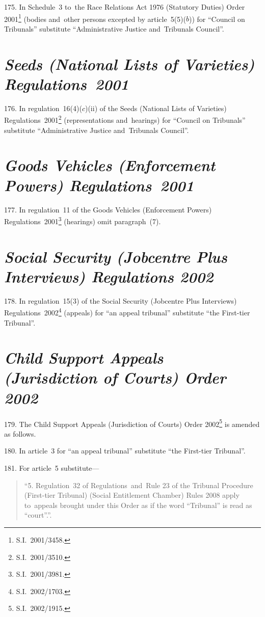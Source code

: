 \documentclass[12pt,a4paper]{article}
\begin{document}
175.  In Schedule~3 to~the Race Relations Act 1976 (Statutory Duties) Order 2001\footnote{S.I.~2001/3458.} (bodies and~other persons excepted by article~5(5)($b$)) for “Council on Tribunals” substitute “Administrative Justice and~Tribunals Council”.

\section*{\itshape Seeds (National Lists of Varieties) Regulations~2001}

176.  In regulation~16(4)($c$)(ii)  of the Seeds (National Lists of Varieties) Regulations~2001\footnote{S.I.~2001/3510.} (representations and~hearings) for “Council on Tribunals” substitute “Administrative Justice and~Tribunals Council”.

\section*{\itshape Goods Vehicles (Enforcement Powers) Regulations~2001}

177.  In regulation~11 of the Goods Vehicles (Enforcement Powers) Regulations~2001\footnote{S.I.~2001/3981.} (hearings) omit paragraph~(7).

\section*{\itshape\sloppy Social Security (Jobcentre Plus Interviews) Regulations 2002}

178.  In regulation~15(3) of the Social Security (Jobcentre Plus Interviews) Regulations~2002\footnote{S.I.~2002/1703.} (appeals) for “an appeal tribunal” substitute “the First-tier Tribunal”.

\section*{\itshape\sloppy{} Child Support Appeals (Jurisdiction of Courts) Order 2002}

179.  The Child Support Appeals (Jurisdiction of Courts) Order 2002\footnote{S.I.~2002/1915.} is amended as follows.

\medskip

180.  In article~3 for “an appeal tribunal” substitute “the First-tier Tribunal”.

\medskip

181.  For article~5 substitute—
\begin{quotation}
“5.  Regulation~32 of Regulations~and~Rule 23 of the Tribunal Procedure (First-tier Tribunal) (Social Entitlement Chamber) Rules 2008 apply to~appeals brought under this Order as if the word “Tribunal” is read as “court”.”.
\end{quotation}
\end{document}
